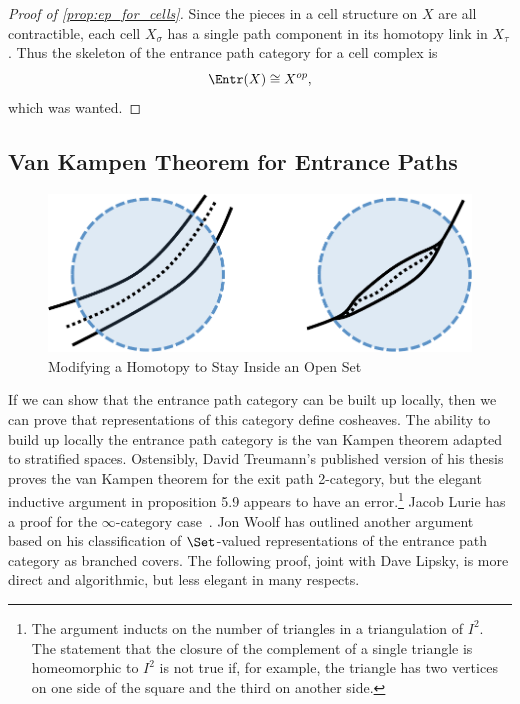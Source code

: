 \begin{proof}[Proof of \ref{prop:ep_for_cells}]
	Since the pieces in a cell structure on $X$ are all contractible, each cell $X_{\sigma}$ has a single path component in its homotopy link in $X_{\tau}$. Thus the skeleton of the entrance path category for a cell complex is
	\[
		\Entr(X)\cong X^{op},
	\]
which was wanted.
\end{proof}

\subsection{Van Kampen Theorem for Entrance Paths}

\begin{figure}
	\centering
	\includegraphics[width=.8\textwidth]{cover_htpy.pdf}
	\caption{Modifying a Homotopy to Stay Inside an Open Set}
	\label{fig:cover_htpy}
\end{figure}

If we can show that the entrance path category can be built up locally, then we can prove that representations of this category define cosheaves. The ability to build up locally the entrance path category is the van Kampen theorem adapted to stratified spaces. Ostensibly, David Treumann's published version of his thesis~\cite{treumann-stacks} proves the van Kampen theorem for the exit path 2-category, but the elegant inductive argument in proposition 5.9 appears to have an error.\footnote{The argument inducts on the number of triangles in a triangulation of $I^2$. The statement that the closure of the complement of a single triangle is homeomorphic to $I^2$ is not true if, for example, the triangle has two vertices on one side of the square and the third on another side.} Jacob Lurie has a proof for the $\infty$-category case~\cite{lurie-dag6}. Jon Woolf has outlined another argument~\cite{woolf-email} based on his classification of $\Set$-valued representations of the entrance path category as branched covers. The following proof, joint with Dave Lipsky, is more direct and algorithmic, but less elegant in many respects.

